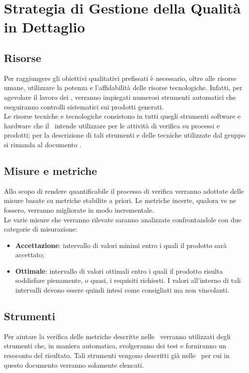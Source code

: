 \section{Strategia di Gestione della Qualità in Dettaglio}
\subsection{Risorse}
Per raggiungere gli obiettivi qualitativi prefissati è necessario, oltre alle risorse umane, utilizzare la potenza e l'affidabilità delle risorse tecnologiche. Infatti, per agevolare il lavoro dei \VerP, verranno impiegati numerosi strumenti automatici che eseguiranno controlli sistematici sui prodotti generati. \\
Le risorse tecniche e tecnologiche consistono in tutti quegli strumenti software e hardware che il \gruppo\ intende utilizzare per le attività di verifica su processi e prodotti; per la descrizione di tali strumenti e delle tecniche utilizzate dal gruppo si rimanda al documento \NdP.

\subsection{Misure e metriche}
Allo scopo di rendere quantificabile il processo di verifica verranno adottate delle misure basate su metriche stabilite a priori. Le metriche incerte, qualora ve ne fossero, verranno migliorate in modo incrementale. \\
Le varie misure che verranno rilevate saranno analizzate confrontandole con due categorie di misurazione:
\begin{itemize}
\item
\textbf{Accettazione}: intervallo di valori minimi entro i quali il prodotto sarà accettato;
\item
\textbf{Ottimale}: intervallo di valori ottimali entro i quali il prodotto risulta soddisfare pienamente, o quasi, i requisiti richiesti. I valori all'interno di tali intervalli devono essere quindi intesi come consigliati ma non vincolanti.
\end{itemize}

\subsection{Strumenti}
Per aiutare la verifica delle metriche descritte nelle \NdP\ verranno utilizzati degli strumenti che, in maniera automatica, svolgeranno dei test e forniranno un resoconto del risultato. Tali strumenti vengono descritti già nelle \NdP\ per cui in questo documento verranno solamente elencati.

